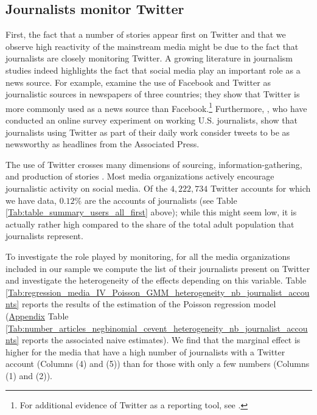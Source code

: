 \subsection{Journalists monitor Twitter}

First, the fact that a number of stories appear first on Twitter and that we observe high reactivity of the mainstream media might be due to the fact that journalists are closely monitoring Twitter. A growing literature in journalism studies indeed highlights the fact that social media play an important role as a news source. For example, \citet{vonNordheimBoczekKoppers2018} examine the use of Facebook and Twitter as journalistic sources in newspapers of three countries; they show that Twitter is more commonly used as a news source than Facebook.\footnote{For additional evidence of Twitter as a reporting tool, see \citet{Vis2012}.} Furthermore, \citet{mcgregor_twitter_2018}, who have conducted an online survey experiment on working U.S. journalists, show that journalists using Twitter as part of their daily work consider tweets to be as newsworthy as headlines from the Associated Press.

The use of Twitter crosses many dimensions of sourcing, information-gathering, and production of stories \citep{Wihbeyetal2018}. Most media organizations actively encourage journalistic activity on social media. Of the $4,222,734$ Twitter accounts for which we have data, $0.12\%$ are the accounts of journalists (see Table \ref{Tab:table_summary_users_all_first} above); while this might seem low, it is actually rather high compared to the share of the total adult population that journalists represent.

To investigate the role played by monitoring, for all the media organizations included in our sample we compute the list of their journalists present on Twitter and investigate the heterogeneity of the effects depending on this variable. Table \ref{Tab:regression_media_IV_Poisson_GMM_heterogeneity_nb_journalist_accounts} reports the results of the estimation of the Poisson regression model (\hyperlink{ref:Appendix}{Appendix} Table \ref{Tab:number_articles_negbinomial_cevent_heterogeneity_nb_journalist_accounts} reports the associated naive estimates). We find that the marginal effect is higher for  the media that have a high number of journalists with a Twitter account (Columns (4) and (5)) than for those with only a few numbers (Columns (1) and (2)).

